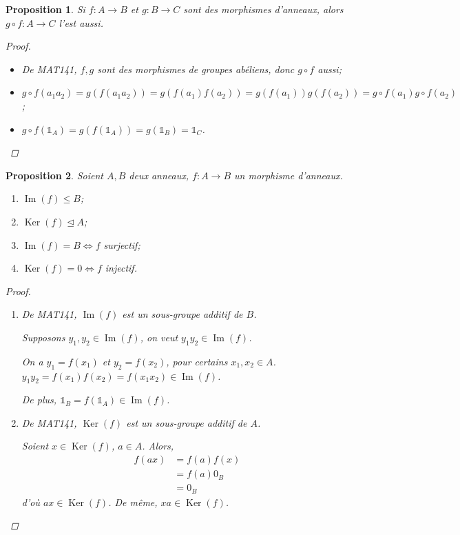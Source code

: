 \documentclass{report}
\newtheorem*{prop}{Proposition}
\theoremstyle{definition}
\theoremstyle{remark}
\def\lte{\leqslant}
\def\id{\mathds{1}}
\def\im{\operatorname{Im}}
\def\noyau{\operatorname{Ker}}
\begin{document}
	\begin{prop}
		Si $f:A\to B$ et $g:B\to C$ sont des morphismes d'anneaux, alors $g\circ f:A\to C$ l'est aussi.
		\begin{proof}~

			\begin{itemize}
				\item De MAT141, $f,g$ sont des morphismes de groupes ab\'eliens, donc $g\circ f$ aussi;
				\item $g\circ f(a_1a_2) = g(f(a_1a_2)) = g(f(a_1)f(a_2)) = g(f(a_1))g(f(a_2)) = g\circ f(a_1)g\circ f(a_2)$;
				\item $g\circ f(\id_A) = g(f(\id_A)) = g(\id_B) = \id_C$.
			\end{itemize}
		\end{proof}
	\end{prop}

	\begin{prop}
		Soient $A,B$ deux anneaux, $f:A\to B$ un morphisme d'anneaux.
		\begin{enumerate}
			\item $\im(f)\lte B$;
			\item $\noyau(f)\trianglelefteq A$;
			\item $\im(f)=B \Longleftrightarrow f$ surjectif;
			\item $\noyau(f)=0 \Longleftrightarrow f$ injectif.
		\end{enumerate}
		\begin{proof}~

			\begin{enumerate}
				\item De MAT141, $\im(f)$ est un sous-groupe additif de $B$.

				Supposons $y_1,y_2\in\im(f)$, on veut $y_1y_2\in\im(f)$.

				On a $y_1=f(x_1)$ et $y_2=f(x_2)$, pour certains $x_1,x_2\in A$. $y_1y_2=f(x_1)f(x_2)=f(x_1x_2)\in\im(f)$.

				De plus, $\id_B=f(\id_A)\in\im(f)$.
				\item De MAT141, $\noyau(f)$ est un sous-groupe additif de $A$.

				Soient $x\in\noyau(f)$, $a\in A$. Alors,
				\begin{align*}
					f(ax)&= f(a)f(x)\\
					&= f(a)0_B\\
					&= 0_B
				\end{align*}
				d'o\`u $ax\in\noyau(f)$. De m\^eme, $xa\in\noyau(f)$.
			\end{enumerate}
		\end{proof}
	\end{prop}
\end{document}
